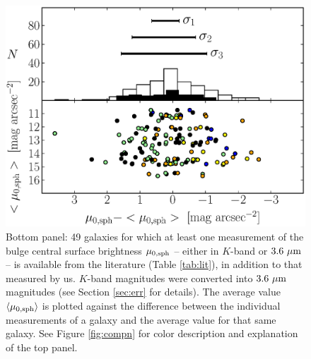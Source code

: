 \documentclass[preprint2]{emulateapj}
\begin{document}
\begin{figure}%
\begin{center}
\includegraphics[width=1.1\columnwidth]{images/comparison_all_mu_0.eps} 
\caption{Bottom panel: 49 galaxies for which at least one measurement of the bulge central surface brightness $\mu_{\rm 0,sph}$ 
-- either in $K$-band or $3.6~\rm \mu m$ -- is available from the literature (Table \ref{tab:lit}), in addition to that measured by us. 
$K$-band magnitudes were converted into $3.6~\rm \mu m$ magnitudes (see Section \ref{sec:err} for details).
The average value $\langle \mu_{\rm 0,sph} \rangle$ is plotted against 
the difference between the individual measurements of a galaxy 
and the average value for that same galaxy.
See Figure \ref{fig:compn} for color description and explanation of the top panel.}
\label{fig:compmu0}
\end{center}
\end{figure}
\end{document}
